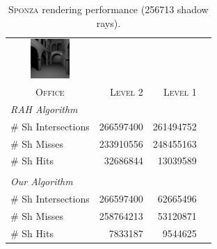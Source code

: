 \documentclass{egpubl}
\begin{document}
\begin{table}[!htb]
\begin{center}
\fontsize{7}{9}
\selectfont
\begin{tabular}{l|rrr}
    \multicolumn{1}{c}{\includegraphics[width=1.5cm]{Images/Sponza_Preview}} & & \\
    \multicolumn{1}{c|}{\textsc{Office}} & \textsc{Level 2} & \textsc{Level 1}\\
    \hline
    \emph{RAH Algorithm} & & \\
    \hline
    \quad \# Sh Intersections  & 266597400	& 261494752	  \\
    \quad \# Sh Misses            & 233910556  & 248455163	  \\
    \quad \# Sh Hits              & 32686844	& 13039589	  \\
    & & \\
    \hline
    \emph{Our Algorithm} & & \\
    \hline
    \quad \# Sh Intersections   & 266597400 & 62665496	  \\
    \quad \# Sh Misses          & 258764213 & 53120871	  \\
    \quad \# Sh Hits            & 7833187	& 9544625	  \\
\end{tabular}
\end{center}
\caption{\label{table:sponza-results}
\textsc{Sponza} rendering performance (256713 shadow rays).}
\end{table}
\end{document}
